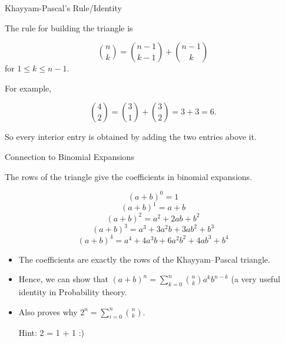 \begin{frame}{Khayyam-Pascal's Rule/Identity}

The rule for building the triangle is





\begin{tcolorbox}[
enhanced,
colback=white,
colframe=blue!70!black,
drop shadow,
arc=2mm,
boxrule=0.8pt
]
\[
\binom{n}{k}
=
\binom{n-1}{k-1}
+
\binom{n-1}{k}
\]
for $1\leq k\leq n-1$.
\end{tcolorbox}









\vspace{0.3cm}

For example,

\[
\binom{4}{2}
=
\binom{3}{1}
+
\binom{3}{2}
=
3+3
=
6.
\]

\vspace{0.25cm}

So every interior entry is obtained by adding the two entries above it.

\end{frame}


\begin{frame}{Connection to Binomial Expansions}

The rows of the triangle give the coefficients in binomial expansions.

\[
(a+b)^0 = 1
\]
\[
(a+b)^1 = a+b
\]
\[
(a+b)^2 = a^2+2ab+b^2
\]
\[
(a+b)^3 = a^3+3a^2b+3ab^2+b^3
\]
\[
(a+b)^4 = a^4+4a^3b+6a^2b^2+4ab^3+b^4
\]

\vspace{0.25cm}

\begin{itemize}
    \item The coefficients are exactly the rows of the Khayyam--Pascal triangle. 

\item Hence, we can show that $(a+b)^n = \sum_{k=0}^n \binom{n}{k} a^k b^{n-k}$ (a very useful identity in Probability theory. 

\item Also proves why $2^n = \sum_{i=0}^n \binom{n}{k}$. 

Hint: 2 = 1 + 1 :)
\end{itemize}

\end{frame}


